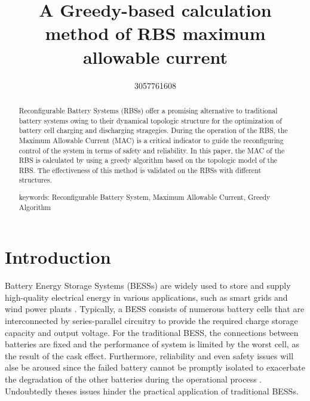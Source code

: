 \documentclass{article}
\title{A Greedy-based calculation method of RBS maximum allowable current}
\author{3057761608 }
\begin{document}
\maketitle

\begin{abstract}
    Reconfigurable Battery Systems (RBSs) offer a promising alternative to traditional battery systems owing to their dynamical topologic structure for the optimization of battery cell charging and discharging stragegies.
    During the operation of the RBS, the Maximum Allowable Current (MAC) is a critical indicator to guide the reconfiguring control of the system in terms of safety and reliability.
    In this paper, the MAC of the RBS is calculated by using a greedy algorithm based on the topologic model of the RBS.
    The effectiveness of this method is validated on the RBSs with different structures.


    keywords: Reconfigurable Battery System, Maximum Allowable Current, Greedy Algorithm
\end{abstract}

\section{Introduction}

Battery Energy Storage Systems (BESSs) are widely used to store and supply high-quality electrical energy in various applications, such as smart grids and wind power plants \cite{desiqueiraControlStrategySmooth2021,karandehTwoStageAlgorithmOptimal2019,yangBatteryEnergyStorage2018,choCommercialResearchBattery2015}.
Typically, a BESS consists of numerous battery cells that are interconnected by series-parallel circuitry to provide the required charge storage capacity and output voltage.
For the traditional BESS, the connections between batteries are fixed and the performance of system is limited by the worst cell, as the result of the cask effect.
Furthermore, reliability and even safety issues will alse be aroused since the failed battery cannot be promptly isolated to exacerbate the degradation of the other batteries during the operational process \cite{yangUnbalancedDischargingAging2016,fengPropagationMechanismsDiagnosis2019}.
Undoubtedly theses issues hinder the practical application of traditional BESSs.
\end{document}
